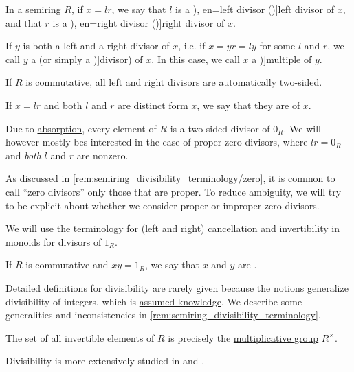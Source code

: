\begin{definition}\label{def:semiring_divisibility}\mimprovised
  In a \hyperref[def:semiring]{semiring} \( R \), if \( x = lr \), we say that \( l \) is a \term[ru=левый делитель (\cite[65]{Ляпин1960Полугруппы}), en=left divisor (\cite[11]{Golan1999Semirings})]{left divisor} of \( x \), and that \( r \) is a \term[ru=прявый делитель (\cite[65]{Ляпин1960Полугруппы}), en=right divisor (\cite[11]{Golan1999Semirings})]{right divisor} of \( x \).

  If \( y \) is both a left and a right divisor of \( x \), i.e. if \( x = yr = ly \) for some \( l \) and \( r \), we call \( y \) a  (or simply a \term[en=multiple (\cite[140]{Jacobson1985BasicAlgebraI})]{divisor}) of \( x \). In this case, we call \( x \) a \term[en=multiple (\cite[140]{Jacobson1985BasicAlgebraI})]{multiple} of \( y \).

  If \( R \) is commutative, all left and right divisors are automatically two-sided.

  \begin{thmenum}
     If \( x = lr \) and both \( l \) and \( r \) are distinct form \( x \), we say that they are  of \( x \).

     Due to \hyperref[def:semigroup_absorbing_element]{absorption}, every element of \( R \) is a two-sided divisor of \( 0_R \). We will however mostly bes interested in the case of proper zero divisors, where \( lr = 0_R \) and \emph{both} \( l \) and \( r \) are nonzero.

    As discussed in \cref{rem:semiring_divisibility_terminology/zero}, it is common to call \enquote{zero divisors} only those that are proper. To reduce ambiguity, we will try to be explicit about whether we consider proper or improper zero divisors.

     We will use the terminology for (left and right) cancellation and invertibility in monoids for divisors of \( 1_R \).

    If \( R \) is commutative and \( xy = 1_R \), we say that \( x \) and \( y \) are .
  \end{thmenum}
\end{definition}
\begin{comments}
  \item Detailed definitions for divisibility are rarely given because the notions generalize divisibility of integers, which is \hyperref[con:assumed_knowledge]{assumed knowledge}. We describe some generalities and inconsistencies in \cref{rem:semiring_divisibility_terminology}.

  \item The set of all invertible elements of \( R \) is precisely the \hyperref[def:semiring]{multiplicative group} \( R^\times \).

  \item Divisibility is more extensively studied in  and .
\end{comments}

